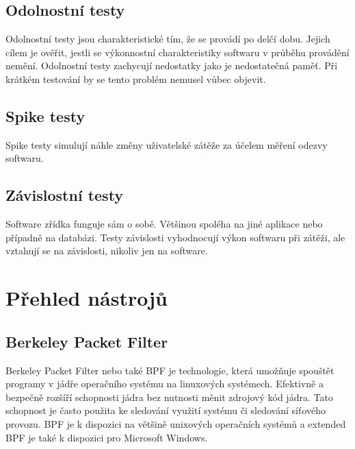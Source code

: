 \subsection*{Odolnostní testy}

Odolnostní testy jsou charakteristické tím, že se provádí po delčí dobu. Jejich cílem je ověřit, jestli se výkonnostní charakteristiky softwaru v průběhu provádění nemění. Odolnostní testy
zachycují nedostatky jako je nedostatečná paměť. Při krátkém testování by se tento problém nemusel vůbec objevit.

\subsection*{Spike testy}

Spike testy simulují náhle změny uživatelské zátěže za účelem měření odezvy softwaru.

\subsection*{Závislostní testy}

Software zřídka funguje sám o sobě. Většinou spoléha na jiné aplikace nebo případně na databázi. Testy závislosti vyhodnocují výkon softwaru při zátěži, ale vztahují se na závislosti, nikoliv
jen na software.

\iffalse
https://searchsoftwarequality.techtarget.com/answer/Required-prerequisites-for-performance-testing
\fi

\iffalse
\subsection{Existující řešení}
\fi

\section{Přehled nástrojů}

\subsection{Berkeley Packet Filter}

Berkeley Packet Filter nebo také BPF je technologie, která umožňuje spouštět programy v jádře operačního systému na linuxových systémech.
Efektivně a bezpečně rozšíří schopnosti jádra bez nutnosti měnit zdrojový kód jádra. Tato schopnost je často použita ke sledování využití systému či sledování síťového provozu.
BPF je k dispozici na většině unixových operačních systémů a extended BPF je také k dispozici pro Microsoft Windows.

